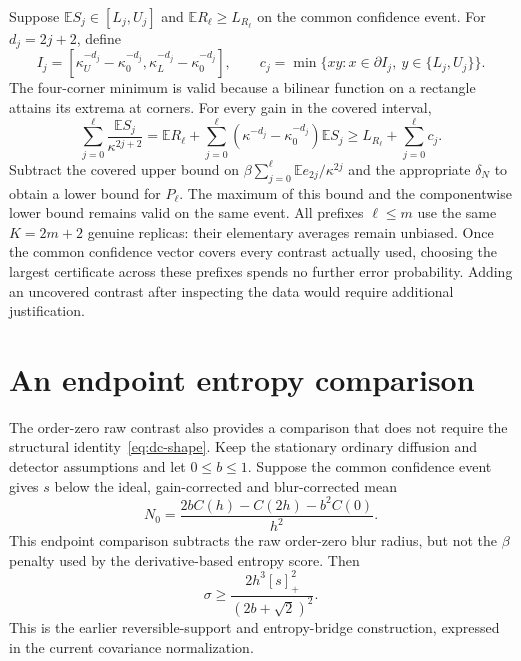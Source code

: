 Suppose $\mathbb ES_j\in[L_j,U_j]$ and
$\mathbb ER_\ell\ge L_{R_\ell}$ on the common confidence event.  For
$d_j=2j+2$, define
\[
 I_j=[\kappa_U^{-d_j}-\kappa_0^{-d_j},
       \kappa_L^{-d_j}-\kappa_0^{-d_j}],\qquad
 c_j=\min\{xy:x\in\partial I_j,\ y\in\{L_j,U_j\}\}.
\]
The four-corner minimum is valid because a bilinear function on a rectangle
attains its extrema at corners.  For every gain in the covered interval,
\begin{equation}
 \sum_{j=0}^{\ell}\frac{\mathbb ES_j}{\kappa^{2j+2}}
 =\mathbb ER_\ell+
   \sum_{j=0}^{\ell}(\kappa^{-d_j}-\kappa_0^{-d_j})\mathbb ES_j
 \ge L_{R_\ell}+\sum_{j=0}^{\ell}c_j.
 \label{eq:dc-correlation-projection}
\end{equation}
Subtract the covered upper bound on
$\beta\sum_{j=0}^{\ell}\mathbb E e_{2j}/\kappa^{2j}$ and the appropriate
$\delta_N$ to obtain a lower bound for $P_\ell$.  The maximum of this bound
and the componentwise lower bound remains valid on the same event.  All
prefixes $\ell\le m$ use the same $K=2m+2$ genuine replicas: their elementary
averages remain unbiased.  Once the common confidence vector covers every
contrast actually used, choosing the largest certificate across these
prefixes spends no further error probability.  Adding an uncovered contrast
after inspecting the data would require additional justification.

\section{An endpoint entropy comparison}

The order-zero raw contrast also provides a comparison that does not require
the structural identity~\eqref{eq:dc-shape}.  Keep the stationary ordinary
diffusion and detector assumptions and let $0\le b\le1$.  Suppose the common
confidence event gives $s$ below the ideal, gain-corrected and blur-corrected
mean
\begin{equation}
 N_0=\frac{2bC(h)-C(2h)-b^2C(0)}{h^2}.
 \label{eq:dc-endpoint-target}
\end{equation}
This endpoint comparison subtracts the raw order-zero blur radius, but not
the $\beta$ penalty used by the derivative-based entropy score.  Then
\begin{equation}
 \sigma\ge\frac{2h^3[s]_+^2}{(2b+\sqrt2)^2}.
 \label{eq:dc-endpoint-baseline}
\end{equation}
This is the earlier reversible-support and entropy-bridge construction,
expressed in the current covariance normalization.

